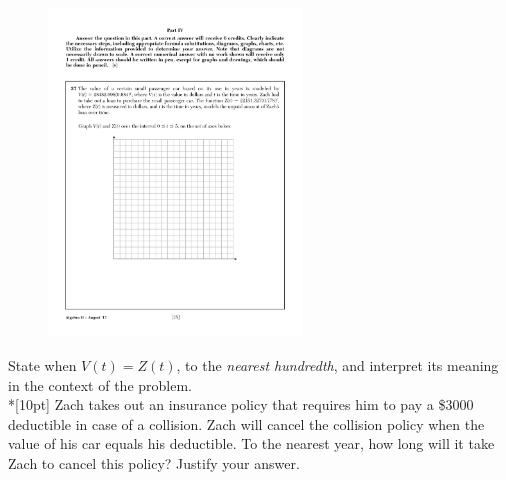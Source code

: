 \begin{figure}[!ht]
    \centering
    \includegraphics[width=0.6\textwidth]{1stQ-grid.pdf}
\end{figure}

State when $V(t) = Z(t)$, to the \textit{nearest hundredth}, and interpret its meaning in the context of the problem.\\*[10pt]
Zach takes out an insurance policy that requires him to pay a \$3000 deductible in case of a collision. Zach will cancel the collision policy when the value of his car equals his deductible.
To the nearest year, how long will it take Zach to cancel this policy? Justify your answer.
